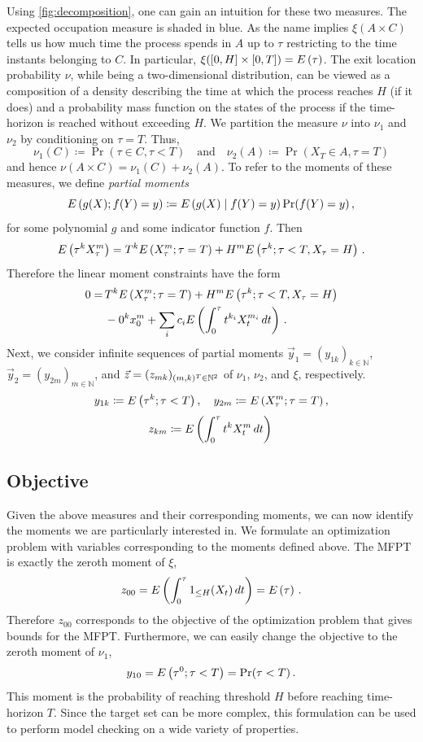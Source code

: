 Using \autoref{fig:decomposition}, one can gain an intuition for these two measures.
The expected occupation measure is shaded in blue.
As the name implies $\xi(A\times C)$ tells us how much time  the process spends
in $A$ up
to $\tau$ restricting to the time instants belonging to $C$.
In particular, $\xi([0,H]\times [0,T])={E}\left(\tau\right)$.
The exit location probability $\nu$, while being a two-dimensional distribution, can be viewed as a composition of a density describing the time at which the process reaches $H$ (if it does) and a probability mass function on the states of the process if the time-horizon is reached without exceeding $H$.
We partition the measure $\nu$ into $\nu_1$ and $\nu_2$ by conditioning on $\tau=T$.
Thus, $$\nu_1(C)\coloneqq\Pr(\tau\in C, \tau<T)\quad\text{and}\quad\nu_2(A)\coloneqq\Pr(X_T\in
A, \tau=T)$$
and hence $\nu(A\times C)=\nu_1(C)+\nu_2(A)$.
To refer to the moments of these measures, we define \emph{partial moments}
$$
    {E}\left(g({X}); f({Y}) = y\right)\coloneqq
    {E}\left(g({X})\mid f({Y})=y\right)\Pr(f({Y})=y)\,,
$$
for some polynomial $g$ and some indicator function $f$. Then
$${E}\left(\tau^k X_{\tau}^m\right)=T^k{E}\left(X_{\tau}^m;\tau=T\right) + H^m{E}\left({\tau}^k;\tau < T, X_{\tau}=H\right)\,.$$
Therefore the linear moment constraints have the form
\begin{equation}
    \begin{split}
        0 = \,&T^k{E}\left(X_{\tau}^m;\tau=T\right) + H^m{E}\left({\tau}^k;\tau < T, X_{\tau}=H\right)\\
        &- 0^kx_0^{m}
        + \sum_{i}c_i{E}\left(\int_{0}^{\tau} t^{k_i}X_t^{m_i}\,dt\right)\,.
    \end{split}
\end{equation}
Next, we consider infinite sequences of partial moments 
 $\vec{y}_1=(y_{1k})_{k\in\mathbb{N}}$, $\vec{y}_2=(y_{2m})_{m\in\mathbb{N}}$, and $\vec{z}=(z_{mk})_{(m,k)^{T}\in\mathbb{N}^2}$
 of $\nu_1$, $\nu_2$, and $\xi$, respectively.
$$y_{1k} \coloneqq {E}\left({\tau}^k;\tau < T\right),\quad y_{2m}\coloneqq{E}\left(X_{\tau}^m;\tau=T\right),$$
$$z_{km}\coloneqq{E}\left(\int_0^{\tau}t^k X_t^m\,dt\right)\,$$

\subsection{Objective}
Given the above measures and their corresponding moments, we can
now identify the moments we are particularly interested in.
We formulate an optimization problem with variables corresponding 
to the moments defined above.
The \ac{MFPT} is exactly the zeroth moment of $\xi$,
$$z_{00}={E}\left(\int_0^{\tau}1_{\leq H}(X_t)\,dt\right) = {E}\left(\tau\right)\,.$$
Therefore $z_{00}$ corresponds to the objective of the optimization problem
that gives bounds for the \ac{MFPT}.
Furthermore, we can easily change the objective to the  
zeroth moment of $\nu_1$,
$$y_{10} = {E}\left(\tau^0;\tau<T\right)=\Pr(\tau < T)\,.$$
This moment is the probability of reaching
threshold $H$ before reaching time-horizon $T$. Since the target set can be more complex, this formulation can be used to perform model checking on a
wide variety of properties.

